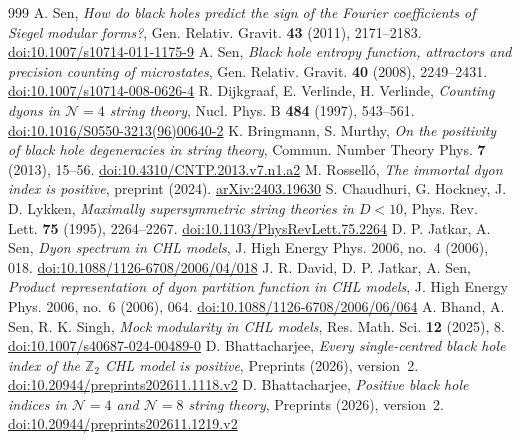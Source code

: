 \documentclass[11pt]{amsart}
\numberwithin{equation}{section}
\theoremstyle{plain}
\theoremstyle{remark}
\begin{document}
\begin{thebibliography}{999}
 A. Sen, \emph{How do black holes predict the sign of the Fourier coefficients of Siegel modular forms?}, Gen. Relativ. Gravit. \textbf{43} (2011), 2171--2183. \href{https://doi.org/10.1007/s10714-011-1175-9}{doi:10.1007/s10714-011-1175-9}
 A. Sen, \emph{Black hole entropy function, attractors and precision counting of microstates}, Gen. Relativ. Gravit. \textbf{40} (2008), 2249--2431. \href{https://doi.org/10.1007/s10714-008-0626-4}{doi:10.1007/s10714-008-0626-4}
 R. Dijkgraaf, E. Verlinde, H. Verlinde, \emph{Counting dyons in $\mathcal N=4$ string theory}, Nucl. Phys. B \textbf{484} (1997), 543--561. \href{https://doi.org/10.1016/S0550-3213(96)00640-2}{doi:10.1016/S0550-3213(96)00640-2}
 K. Bringmann, S. Murthy, \emph{On the positivity of black hole degeneracies in string theory}, Commun. Number Theory Phys. \textbf{7} (2013), 15--56. \href{https://doi.org/10.4310/CNTP.2013.v7.n1.a2}{doi:10.4310/CNTP.2013.v7.n1.a2}
 M. Rossell\'o, \emph{The immortal dyon index is positive}, preprint (2024). \href{https://arxiv.org/abs/2403.19630}{arXiv:2403.19630}
 S. Chaudhuri, G. Hockney, J. D. Lykken, \emph{Maximally supersymmetric string theories in $D<10$}, Phys. Rev. Lett. \textbf{75} (1995), 2264--2267. \href{https://doi.org/10.1103/PhysRevLett.75.2264}{doi:10.1103/PhysRevLett.75.2264}
 D. P. Jatkar, A. Sen, \emph{Dyon spectrum in CHL models}, J. High Energy Phys. 2006, no.~4 (2006), 018. \href{https://doi.org/10.1088/1126-6708/2006/04/018}{doi:10.1088/1126-6708/2006/04/018}
 J. R. David, D. P. Jatkar, A. Sen, \emph{Product representation of dyon partition function in CHL models}, J. High Energy Phys. 2006, no.~6 (2006), 064. \href{https://doi.org/10.1088/1126-6708/2006/06/064}{doi:10.1088/1126-6708/2006/06/064}
 A. Bhand, A. Sen, R. K. Singh, \emph{Mock modularity in CHL models}, Res. Math. Sci. \textbf{12} (2025), 8. \href{https://doi.org/10.1007/s40687-024-00489-0}{doi:10.1007/s40687-024-00489-0}
 D. Bhattacharjee, \emph{Every single-centred black hole index of the $\mathbb Z_2$ CHL model is positive}, Preprints (2026), version~2. \href{https://doi.org/10.20944/preprints202611.1118.v2}{doi:10.20944/preprints202611.1118.v2}
 D. Bhattacharjee, \emph{Positive black hole indices in $\mathcal N=4$ and $\mathcal N=8$ string theory}, Preprints (2026), version~2. \href{https://doi.org/10.20944/preprints202611.1219.v2}{doi:10.20944/preprints202611.1219.v2}

\end{thebibliography}
\end{document}
